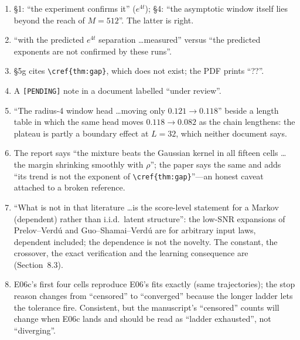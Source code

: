 \begin{enumerate}
\item {} \S1: ``the experiment confirms it'' ($e^{4t}$); \S4: ``the asymptotic window itself lies beyond the reach of $M=512$''. The latter is right.
\item {} ``with the predicted $e^{4t}$ separation \ldots measured'' versus ``the predicted exponents are not confirmed by these runs''.
\item {} \S5g cites \verb|\cref{thm:gap}|, which does not exist; the PDF prints ``??''.
\item {} A \texttt{[PENDING]} note in a document labelled ``under review''.
\item {} ``The radius-4 window head \ldots moving only $0.121\to0.118$'' beside a length table in which the same head moves $0.118\to0.082$ as the chain lengthens: the plateau is partly a boundary effect at $L=32$, which neither document says.
\item {} The report says ``the mixture beats the Gaussian kernel in all fifteen cells \ldots the margin shrinking smoothly with $\rho$''; the paper says the same and adds ``its trend is not the exponent of \verb|\cref{thm:gap}|''---an honest caveat attached to a broken reference.
\item {} ``What is not in that literature \ldots is the score-level statement for a Markov (dependent) rather than i.i.d.\ latent structure'': the low-SNR expansions of Prelov--Verd\'u and Guo--Shamai--Verd\'u are for arbitrary input laws, dependent included; the dependence is not the novelty. The constant, the crossover, the exact verification and the learning consequence are (Section~8.3).
\item {} E06c's first four cells reproduce E06's fits exactly (same trajectories); the stop reason changes from ``censored'' to ``converged'' because the longer ladder lets the tolerance fire. Consistent, but the manuscript's ``censored'' counts will change when E06c lands and should be read as ``ladder exhausted'', not ``diverging''.
\end{enumerate}
